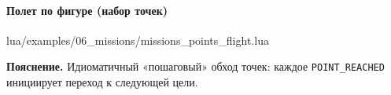 \paragraph{Полет по фигуре (набор точек)}
\begin{codefile}{lua/examples/06_missions/missions_points_flight.lua}
\end{codefile}
\textbf{Пояснение.} Идиоматичный «пошаговый» обход точек: каждое \texttt{POINT\_REACHED} инициирует переход к следующей цели.

